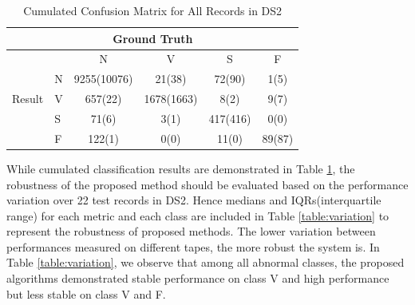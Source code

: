\begin{table}[t]
	\centering
	\caption{Cumulated Confusion Matrix for All Records in DS2}
	\vspace{-0.05in}
	\begin{tabular}{|l|l|c|c|c|c|}
		\hline 
		&  \multicolumn{4}{c}{Ground Truth} &\\ 
        \hline
		\multirow{5}{*}{Result} &  & N & V & S & F  \\\cline{2-6}
		& N & 9255(10076)& 21(38) & 72(90) & 1(5) \\\cline{2-6} 
		&V & 657(22) & 1678(1663) & 8(2) & 9(7)  \\\cline{2-6}
		&S & 71(6) & 3(1) & 417(416) & 0(0)  \\\cline{2-6}
        &F& 122(1) & 0(0) & 11(0) & 89(87)  \\\hline
	\end{tabular}
	\label{table:classification_cumu} 
	\vspace{-0.15in}
\end{table}

While cumulated classification results are demonstrated in Table \ref{table:classification_cumu}, the robustness of the proposed method should be evaluated based on the performance variation over 22 test records in DS2. Hence medians and IQRs(interquartile range) for each metric and each class are included in Table \ref{table:variation} to represent the robustness of proposed methods. The lower variation between performances measured on different tapes, the more robust the system is. In Table \ref{table:variation}, we observe that among all abnormal classes, the proposed algorithms demonstrated stable performance on class V and high performance but less stable on class V and F.

